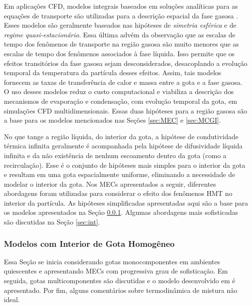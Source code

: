 Em aplicações CFD, modelos integrais baseados em soluções analíticas para as equações de transporte são utilizadas para a descrição espacial da fase gasosa \cite{Sazhin2006}.
Esses modelos são geralmente baseados nas hipóteses de \emph{simetria esférica} e de \emph{regime quasi-estacionário}.
Essa última advém da observação que as escalas de tempo dos fenômenos de transporte na região gasosa são muito menores que as escalas de tempo dos fenômenos associados à fase líquida. Isso permite que os efeitos transitórios da fase gasosa sejam desconsiderados, desacoplando a evolução temporal da temperatura da partícula desses efeitos. 
Assim, tais modelos fornecem as taxas de transferência de calor e massa entre a gota e a fase gasosa.
O uso desses modelos reduz o custo computacional e viabiliza a descrição dos mecanismos de evaporação e condensação, com evolução temporal da gota, em simulações CFD multidimensionais.
Essas duas hipóteses para a região gasosa são a base para os modelos mencionados nas Seções \ref{sec:MEC} e \ref{sec:MCGI}.


No que tange a região líquida, do interior da gota, a hipótese de condutividade térmica infinita geralmente é acompanhada pela hipótese de difusividade líquida infinita e da não existência de nenhum escoamento dentro da gota (como a recirculação).
Esse é o conjunto de hipóteses mais simples para o interior da gota e resultam em uma gota espacialmente uniforme, eliminando a necessidade de modelar o interior da gota.
Nos MECs apresentados a seguir, diferentes abordagens foram utilizadas para considerar o efeito dos fenômenos HMT no interior da partícula.
As hipóteses simplificadas apresentadas aqui são a base para os modelos apresentados na Seção \ref{sec:RMM}.
Algumas abordagens mais sofisticadas são discutidas na Seção \ref{sec:int}.




\subsubsection{Modelos com Interior de Gota Homogêneo} \label{sec:RMM}

Essa Seção se inicia considerando gotas monocomponentes em ambientes quiescentes e apresentando MECs com progressiva grau de sofisticação.
Em seguida, gotas multicomponentes são discutidas e o modelo desenvolvido em \cite{SacomanoF2022IJHMT} é apresentado.
Por fim, alguns comentários sobre termodinâmica de mistura não ideal.

